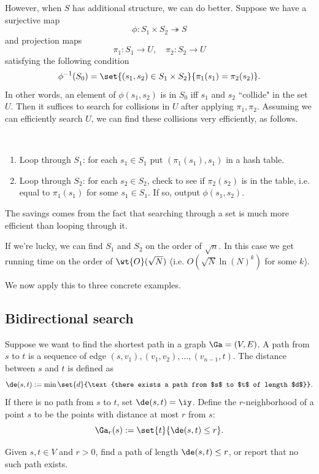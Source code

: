 However, when $S$ has additional structure, we can do better. Suppose we have a surjective map
\[\phi:S_1\times S_2\twoheadrightarrow S\]
and projection maps 
\[\pi_1:S_1\to U,\quad \pi_2:S_2\to U\]
satisfying the following condition 
\[\phi^{-1}(S_0)=\set{(s_1,s_2)\in S_1\times S_2}{\pi_1(s_1)=\pi_2(s_2)}.\]
In other words, an element of $\phi(s_1,s_2)$ is in $S_0$ iff $s_1$ and $s_2$ ``collide" in the set $U$. Then it suffices to search for collisions in $U$ after applying $\pi_1,\pi_2$. 
Assuming we can efficiently search $U$, we can find these collisions very efficiently, as follows.
\begin{alg}
$\,$
\begin{enumerate}
\item
Loop through $S_1$: for each $s_1\in S_1$ put $(\pi_1(s_1),s_1)$ in a hash table.
\item
Loop through $S_2$: for each $s_2\in S_2$, check to see if $\pi_2(s_2)$ is in the table, i.e. equal to $\pi_1(s_1)$ for some $s_1\in S_1$. If so, output $\phi(s_1,s_2)$.
\end{enumerate}
\end{alg}
The savings comes from the fact that searching through a set is much more efficient than looping through it. 

If we're lucky, we can find $S_1$ and $S_2$  on the order of $\sqrt n$. In this case we get running time on the order of $\wt{O}(\sqrt N)$ (i.e. $O(\sqrt N\ln(N)^k)$ for some $k$).

We now apply this to three concrete examples.
\subsection{Bidirectional search}\label{sec:bidir}
Suppose we want to find the shortest path in a graph $\Ga=(V,E)$. A path from $s$ to $t$ is a sequence of edge $(s,v_1),(v_1,v_2),\ldots, (v_{n-1},t)$. The distance between $s$ and $t$ is defined as
\[
\de(s,t):=\min\set{d}{\text{there exists a path from $s$ to $t$ of length $d$}}.
\]
If there is no path from $s$ to $t$, set $\de(s,t)=\iy$. Define the $r$-neighborhood of a point $s$ to be the points with distance at most $r$ from $s$:
\[
\Ga_r(s):=\set{t}{\de(s,t)\le r}.
\]
\begin{prb}
Given $s,t\in V$ and $r>0$, find a path of length $\de(s,t)\le r$, or report that no such path exists.
\end{prb}

